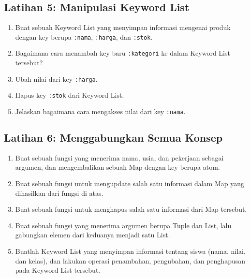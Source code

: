 \subsection{Latihan 5: Manipulasi Keyword List}
\begin{enumerate}
	\item Buat sebuah Keyword List yang menyimpan informasi mengenai produk dengan key berupa \texttt{:nama}, \texttt{:harga}, dan \texttt{:stok}.
	\item Bagaimana cara menambah key baru \texttt{:kategori} ke dalam Keyword List tersebut?
	\item Ubah nilai dari key \texttt{:harga}.
	\item Hapus key \texttt{:stok} dari Keyword List.
	\item Jelaskan bagaimana cara mengakses nilai dari key \texttt{:nama}.
\end{enumerate}

\subsection{Latihan 6: Menggabungkan Semua Konsep}
\begin{enumerate}
	\item Buat sebuah fungsi yang menerima nama, usia, dan pekerjaan sebagai argumen, dan mengembalikan sebuah Map dengan key berupa atom.
	\item Buat sebuah fungsi untuk mengupdate salah satu informasi dalam Map yang dihasilkan dari fungsi di atas.
	\item Buat sebuah fungsi untuk menghapus salah satu informasi dari Map tersebut.
	\item Buat sebuah fungsi yang menerima argumen berupa Tuple dan List, lalu gabungkan elemen dari keduanya menjadi satu List.
	\item Buatlah Keyword List yang menyimpan informasi tentang siswa (nama, nilai, dan kelas), dan lakukan operasi penambahan, pengubahan, dan penghapusan pada Keyword List tersebut.
\end{enumerate}

